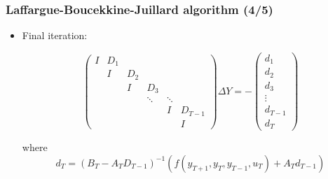 \documentclass[handout,usepdftitle=false,xcolor=dvipsnames,aspectratio=169]{beamer}
\begin{document}
\begin{frame}
  \frametitle{Laffargue-Boucekkine-Juillard algorithm (4/5)}
  \begin{itemize}
    \item Final iteration:
          \begin{small}
            \begin{equation}
              \begin{pmatrix}
                I & D_1 &     &        &        &         \\
                  & I   & D_2 &        &        &         \\
                  &     & I   & D_3    &        &         \\
                  &     &     & \ddots & \ddots &         \\
                  &     &     &        & I      & D_{T-1} \\
                  &     &     &        &        & I
              \end{pmatrix}
              \Delta Y
              =
              -\begin{pmatrix}
                d_1     \\
                d_2     \\
                d_3     \\
                \vdots  \\
                d_{T-1} \\
                d_T
              \end{pmatrix}
            \end{equation}
          \end{small}
          where
          \begin{equation}
            d_T = (B_T-A_TD_{T-1})^{-1}(f(y_{T+1},y_T,y_{T-1},u_T)+A_Td_{T-1})
          \end{equation}
  \end{itemize}
\end{frame}
\end{document}
